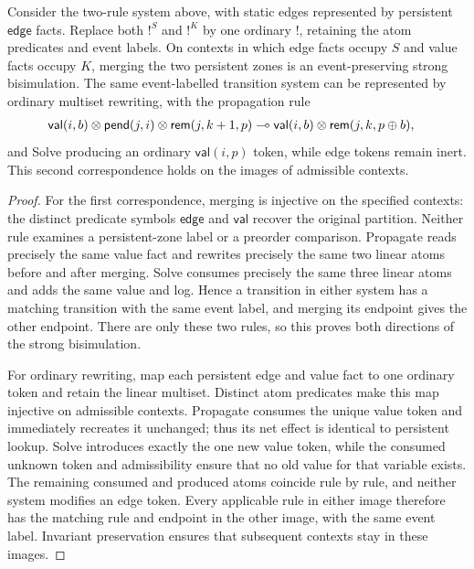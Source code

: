 \begin{prop}
\label{prop:sem-label-erasure}
Consider the two-rule system above, with static edges represented by persistent
$\mathsf{edge}$ facts. Replace both $!^S$ and $!^K$ by one ordinary $!$,
retaining the atom predicates and event labels. On contexts in which edge
facts occupy $S$ and value facts occupy $K$, merging the two persistent zones
is an event-preserving strong bisimulation.
The same event-labelled transition system can be represented by ordinary
multiset rewriting, with the propagation rule
\[
\begin{split}
 \mathsf{val}(i,b)\otimes\mathsf{pend}(j,i)
             \otimes\mathsf{rem}(j,k+1,p)
 \multimap{}&\mathsf{val}(i,b)\otimes\mathsf{rem}(j,k,p\oplus b),
\end{split}
\]
and Solve producing an ordinary $\mathsf{val}(i,p)$ token, while edge
tokens remain inert. This second correspondence holds on the images of
admissible contexts.
\end{prop}
\begin{proof}
For the first correspondence, merging is injective on the specified contexts:
the distinct predicate symbols $\mathsf{edge}$ and $\mathsf{val}$ recover
the original partition. Neither rule examines a persistent-zone label or a
preorder comparison. Propagate reads precisely the same value fact and
rewrites precisely the same two linear atoms before and after merging.
Solve consumes precisely the same three linear atoms and adds the same
value and log. Hence a transition in either system has a matching transition
with the same event label, and merging its endpoint gives the other endpoint.
There are only these two rules, so this proves both directions of the strong
bisimulation.

For ordinary rewriting, map each persistent edge and value fact to one
ordinary token and retain the linear multiset. Distinct atom predicates make
this map injective on admissible contexts. Propagate consumes the unique
value token and immediately recreates it unchanged; thus its net effect is
identical to persistent lookup. Solve introduces exactly the one new value
token, while the consumed unknown token and admissibility ensure that no
old value for that variable exists. The remaining consumed and produced
atoms coincide rule by rule, and neither system modifies an edge token.
Every applicable rule in either image therefore has the matching rule and
endpoint in the other image, with the same event label. Invariant
preservation ensures that subsequent contexts stay in these images.
\end{proof}

